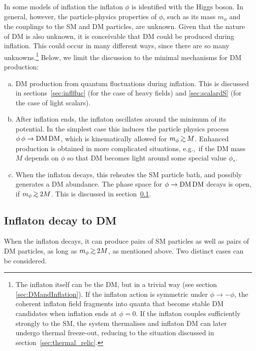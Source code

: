 In some models of inflation the inflaton $\phi$ is identified with the Higgs boson. In general, however, the particle-physics properties of $\phi$, such as its mass $m_\phi$ and the couplings to the SM and DM particles, are unknown.
Given that the nature of DM is also unknown, it is conceivable that DM could be produced during inflation. This could occur in many different ways, since there are so many unknowns.\footnote{The inflaton itself can be the DM, but in a trivial way (see section \ref{sec:DMandInflation}).
If the inflaton action is symmetric under $\phi\to -\phi$,
the coherent inflaton field fragments into quanta 
that become stable DM candidates when inflation ends at $\phi=0$.
If the inflaton couples sufficiently strongly to the SM, the system
thermalises and inflaton DM can later undergo thermal freeze-out, 
reducing to the situation discussed in section~\ref{sec:thermal_relic}.}
Below, we limit the discussion to the minimal mechanisms for DM production:
\begin{enumerate}[a)]
\item DM production from quantum fluctuations during inflation.
This is discussed in sections~\ref{sec:inflfluc} (for the case of heavy fields) and \ref{sec:scalardS} (for the case of light scalars).
 
\item After inflation ends, the inflaton oscillates around the minimum of its potential.
In the simplest case this induces the particle physics process $\phi \,\phi \to {\rm DM}\,{\rm DM}$, which is kinematically allowed for
$m_\phi \circa{>} M$.
Enhanced production is obtained in more complicated situations, e.g.,\ if the DM mass $M$ depends on $\phi$ so that DM becomes light around some special value $\phi_*$.


\item When the inflaton decays, this reheates the SM particle bath, and possibly generates
a DM abundance.
The phase space for $\phi \to {\rm DM}\,{\rm DM}$ decays is open, if $m_\phi \circa{>} 2 M$.
This is discussed in section~\ref{sec:infl}.
\end{enumerate}



\subsection{Inflaton decay to DM}\label{sec:infl}
When the inflaton decays, it can produce pairs of SM particles as well as pairs of DM particles, as long as $m_\phi \circa{>} 2 M$, as mentioned above. 
Two distinct cases can be considered.

